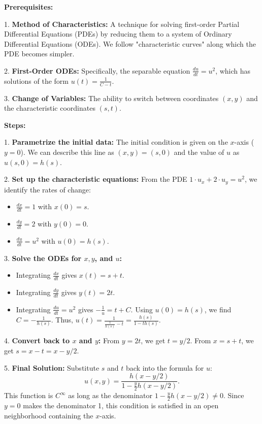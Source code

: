 \begin{solution}
\textbf{Prerequisites:}

1. \textbf{Method of Characteristics:} A technique for solving first-order Partial Differential Equations (PDEs) by reducing them to a system of Ordinary Differential Equations (ODEs). We follow "characteristic curves" along which the PDE becomes simpler.

2. \textbf{First-Order ODEs:} Specifically, the separable equation $\frac{du}{dt} = u^2$, which has solutions of the form $u(t) = \frac{1}{C - t}$.

3. \textbf{Change of Variables:} The ability to switch between coordinates $(x, y)$ and the characteristic coordinates $(s, t)$.


\textbf{Steps:}

1. \textbf{Parametrize the initial data:}
    The initial condition is given on the $x$-axis ($y=0$). We can describe this line as $(x, y) = (s, 0)$ and the value of $u$ as $u(s, 0) = h(s)$.

2. \textbf{Set up the characteristic equations:}
    From the PDE $1 \cdot u_x + 2 \cdot u_y = u^2$, we identify the rates of change:
    \begin{itemize}
        \item $\frac{dx}{dt} = 1$ with $x(0) = s$.
        \item $\frac{dy}{dt} = 2$ with $y(0) = 0$.
        \item $\frac{du}{dt} = u^2$ with $u(0) = h(s)$.
    \end{itemize}

3. \textbf{Solve the ODEs for $x, y$, and $u$:}
    \begin{itemize}
        \item Integrating $\frac{dx}{dt}$ gives $x(t) = s + t$.
        \item Integrating $\frac{dy}{dt}$ gives $y(t) = 2t$.
        \item Integrating $\frac{du}{dt} = u^2$ gives $-\frac{1}{u} = t + C$. Using $u(0) = h(s)$, we find $C = -\frac{1}{h(s)}$. Thus, $u(t) = \frac{1}{\frac{1}{h(s)} - t} = \frac{h(s)}{1 - t h(s)}$.
    \end{itemize}

4. \textbf{Convert back to $x$ and $y$:}
    From $y = 2t$, we get $t = y/2$.
    From $x = s + t$, we get $s = x - t = x - y/2$.

5. \textbf{Final Solution:}
    Substitute $s$ and $t$ back into the formula for $u$:
    \[ u(x, y) = \frac{h(x - y/2)}{1 - \frac{y}{2} h(x - y/2)}. \]
    This function is $C^\infty$ as long as the denominator $1 - \frac{y}{2} h(x - y/2) \neq 0$. Since $y=0$ makes the denominator 1, this condition is satisfied in an open neighborhood containing the $x$-axis.



\end{solution}
